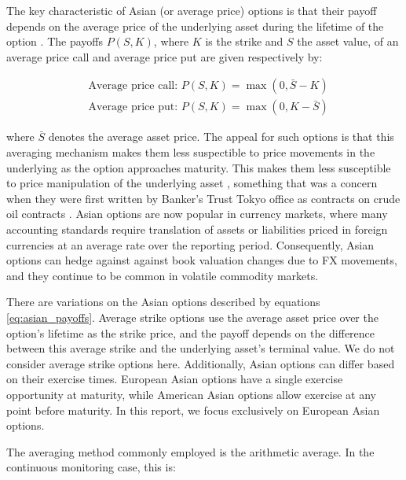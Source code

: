The key characteristic of Asian (or average price) options is that their payoff depends on the average price of the underlying
asset during the lifetime of the option \cite{hull2016options}. The payoffs $P(S, K)$, where $K$ is the strike and $S$ the asset value,
of an average price call and average price put are given respectively by:

\begin{subequations}\label{eq:asian_payoffs}
    \begin{align}
        &\text{Average price call: } P(S, K) = \max(0, \bar{S} - K) \label{eq:asian_call_payoff}\\
        &\text{Average price put: }  P(S, K) = \max(0, K - \bar{S}) \label{eq:asian_put_payoff}
    \end{align}
\end{subequations}

where $\bar{S}$ denotes the average asset price. The appeal for such options is that this averaging mechanism makes them less 
suspectible to price movements in the underlying as the option approaches maturity. 
This makes them less susceptible to price manipulation of the 
underlying asset \cite{kemna1990pricing}, something that was a concern when they were first written by 
Banker's Trust Tokyo office as contracts on crude oil contracts \cite{falloon1999evolution}. Asian options are now popular in currency markets,
where many accounting standards require translation of assets or liabilities priced in foreign currencies at an average rate 
over the reporting period. Consequently, Asian options can hedge against against book valuation changes due to FX movements,
and they continue to be common in volatile commodity markets.

There are variations on the Asian options described by equations \eqref{eq:asian_payoffs}. Average strike options use the average 
asset price over the option's lifetime as the strike price, and the payoff depends on the difference between this average strike and 
the underlying asset's terminal value. We do not consider average strike options here. Additionally, Asian options can differ based
on their exercise times. European Asian options have a single exercise opportunity at maturity, while American Asian options allow
exercise at any point before maturity. In this report, we focus exclusively on European Asian options. 

The averaging method commonly employed is the arithmetic average. In the continuous monitoring case, this is:


